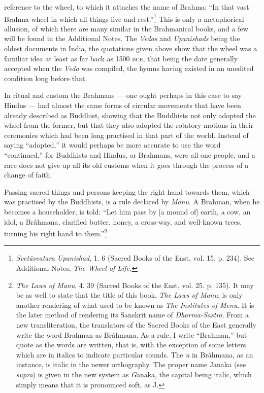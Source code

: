 \documentclass[a4paper, 11pt, oneside, polutonikogreek, english]{article}
\begin{document}
reference to the wheel, to which it attaches the name of Brahma: ``In that vast Brahma-wheel in which all things live and rest.''\footnote{\emph{Svetâsvatara Upanishad}, 1. 6 (Sacred Books of the East, vol. 15. p. 234). See Additional Notes, \emph{The Wheel of Life.}} This is only a metaphorical allusion, of which there are many similar in the Brahmanical books, and a few will be found in the Additional Notes. The \emph{Vedas} and \emph{Upanishads} being the oldest documents in India, the quotations given above show that the wheel was a familiar idea at least as far back as 1500 \textsc{bce}, that being the date generally accepted when the \emph{Veda} was compiled, the hymns having existed in an unedited condition long before that.

In ritual and custom the Brahmans --- one ought perhaps in this case to say Hindus --- had almost the same forms of circular movements that have been already described as Buddhist, showing that the Buddhists not only adopted the wheel from the former, but that they also adopted the rotatory motions in their ceremonies which had been long practised in that part of the world. Instead of saying ``adopted,'' it would perhaps be more accurate to use the word ``continued,'' for Buddhists and Hindus, or Brahmans, were all one people, and a race does not give up all its old customs when it goes through the process of a change of faith.

Passing sacred things and persons keeping the right hand towards them, which was practised by the Buddhists, is a rule declared by \emph{Manu}. A Brahman, when he becomes a householder, is told: ``Let him pass by [a mound of] earth, a cow, an idol, a Brâhmana, clarified butter, honey, a cross-way, and well-known trees, turning his right hand to them.''\footnote{\emph{The Laws of Manu}, 4. 39 (Sacred Books of the East, vol. 25. p. 135). It may be as well to state that the title of this book, \emph{The Laws of Manu}, is only another rendering of what used to be known as \emph{The Institutes of Menu}. It is the later method of rendering its Sanskrit name of \emph{Dharma-Sastra}. From a new transliteration, the translators of the Sacred Books of the East generally write the word Brahman as Brâhmana. As a rule, I write ``Brahman,'' but quote as the words are written, that is, with the exception of some letters which are in italics to indicate particular sounds. The \emph{n} in Brâhmana, as an instance, is italic in the newer orthography. The proper name Janaka (see \emph{supra}) is given in the new system as \emph{G}anaka, the capital being italic, which simply means that it is pronounced soft, as J.}
\end{document}
